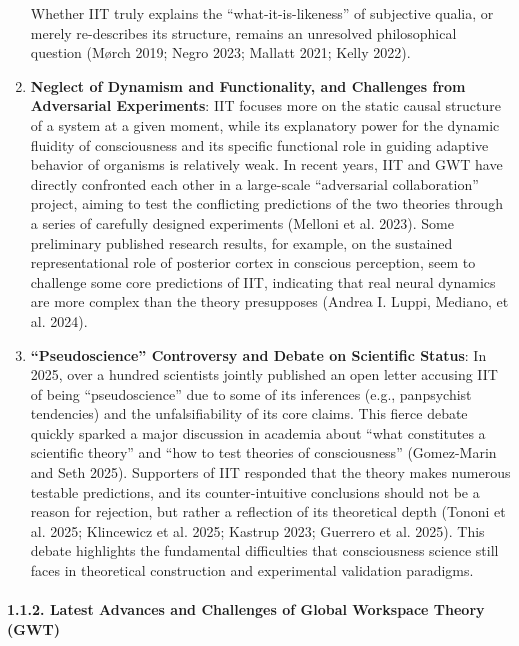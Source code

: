 \documentclass[
  a4paper]{article}
\begin{document}
\begin{enumerate}
  Whether IIT truly explains the ``what-it-is-likeness'' of subjective
  qualia, or merely re-describes its structure, remains an unresolved
  philosophical question (Mørch 2019; Negro 2023; Mallatt 2021; Kelly
  2022).
\item
  \textbf{Neglect of Dynamism and Functionality, and Challenges from
  Adversarial Experiments}: IIT focuses more on the static causal
  structure of a system at a given moment, while its explanatory power
  for the dynamic fluidity of consciousness and its specific functional
  role in guiding adaptive behavior of organisms is relatively weak. In
  recent years, IIT and GWT have directly confronted each other in a
  large-scale ``adversarial collaboration'' project, aiming to test the
  conflicting predictions of the two theories through a series of
  carefully designed experiments (Melloni et al. 2023). Some preliminary
  published research results, for example, on the sustained
  representational role of posterior cortex in conscious perception,
  seem to challenge some core predictions of IIT, indicating that real
  neural dynamics are more complex than the theory presupposes (Andrea
  I. Luppi, Mediano, et al. 2024).
\item
  \textbf{``Pseudoscience'' Controversy and Debate on Scientific
  Status}: In 2025, over a hundred scientists jointly published an open
  letter accusing IIT of being ``pseudoscience'' due to some of its
  inferences (e.g., panpsychist tendencies) and the unfalsifiability of
  its core claims. This fierce debate quickly sparked a major discussion
  in academia about ``what constitutes a scientific theory'' and ``how
  to test theories of consciousness'' (Gomez-Marin and Seth 2025).
  Supporters of IIT responded that the theory makes numerous testable
  predictions, and its counter-intuitive conclusions should not be a
  reason for rejection, but rather a reflection of its theoretical depth
  (Tononi et al. 2025; Klincewicz et al. 2025; Kastrup 2023; Guerrero et
  al. 2025). This debate highlights the fundamental difficulties that
  consciousness science still faces in theoretical construction and
  experimental validation paradigms.
\end{enumerate}

\paragraph{1.1.2. Latest Advances and Challenges of Global Workspace
Theory
(GWT)}\label{latest-advances-and-challenges-of-global-workspace-theory-gwt}
\end{document}
